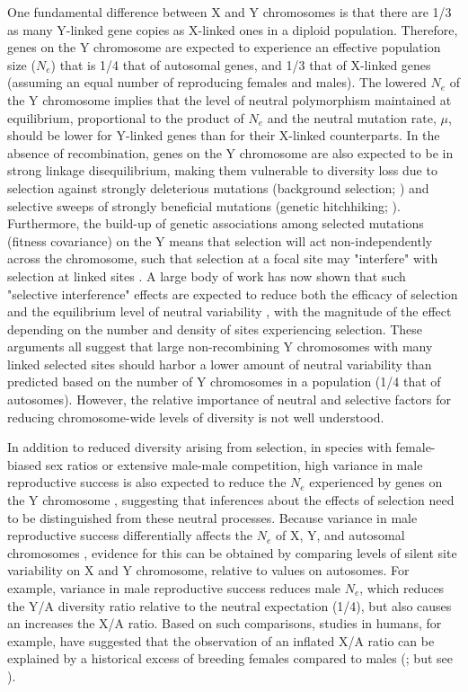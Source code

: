 \documentclass[9pt,twocolumn,twoside]{gsajnl}
\begin{document}
One fundamental difference between X and Y chromosomes is that there are 1/3 as many Y-linked gene copies as X-linked ones in a diploid population. Therefore, genes on the Y chromosome are expected to experience an effective population size ($N_{e}$) that is 1/4 that of autosomal genes, and 1/3 that of X-linked genes (assuming an equal number of reproducing females and males). The lowered $N_{e}$ of the Y chromosome implies that the level of neutral polymorphism maintained at equilibrium, proportional to the product of $N_{e}$ and the neutral mutation rate, $\mu$, should be lower for Y-linked genes than for their X-linked counterparts. In the absence of recombination, genes on the Y chromosome are also expected to be in strong linkage disequilibrium, making them vulnerable to diversity loss due to selection against strongly deleterious mutations (background selection; \citealt{charlesworth1993effect}) and selective sweeps of strongly beneficial mutations (genetic hitchhiking; \citealt{smith1974hitch}). Furthermore, the build-up of genetic associations among selected mutations (fitness covariance) on the Y means that selection will act non-independently across the chromosome, such that selection at a focal site may "interfere" with selection at linked sites \citep{hill1966HReffect}. A large body of work has now shown that such "selective interference" effects are expected to reduce both the efficacy of selection and the equilibrium level of neutral variability \citep{fisher1930genetical, muller1964relation, hill1966HReffect, mcvean2000,KaiserCharlesworth,good2014genetic}, with the magnitude of the effect depending on the number and density of sites experiencing selection. These arguments all suggest that large non-recombining Y chromosomes with many linked selected sites should harbor a lower amount of neutral variability than predicted based on the number of Y chromosomes in a population (1/4 that of autosomes). However, the relative importance of neutral and selective factors for reducing chromosome-wide levels of diversity is not well understood.

In addition to reduced diversity arising from selection, in species with female-biased sex ratios or extensive male-male competition, high variance in male reproductive success is also expected to reduce the $N_{e}$ experienced by genes on the Y chromosome \citep{caballero1995,charlesworth2001,laporte2002,pool2007,ellegren2009}, suggesting that inferences about the effects of selection need to be distinguished from these neutral processes. Because variance in male reproductive success differentially affects the $N_{e}$ of X, Y, and autosomal chromosomes \citep{kimura1964number,nomura2002effective}, evidence for this can be obtained by comparing levels of silent site variability on X and Y chromosome, relative to values on autosomes. For example, variance in male reproductive success reduces male $N_{e}$, which reduces the Y/A diversity ratio relative to the neutral expectation (1/4), but also causes an increases the X/A ratio. Based on such comparisons, studies in humans, for example, have suggested that the observation of an inflated X/A ratio can be explained by a historical excess of breeding females compared to males (\citealt{hammer2008sex}; but see \citealt{bustamante2009,hammer2010,cotter2016genetic}).
\end{document}
